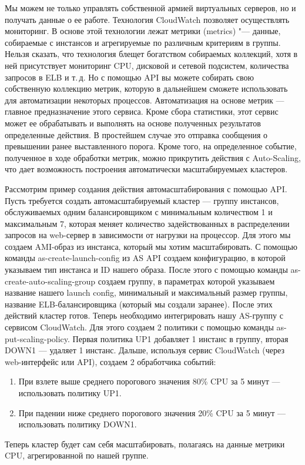 \documentclass[10pt, a5paper]{article}
\begin{document}
Мы можем не только управлять собственной армией виртуальных серверов, но и получать данные о ее работе. Технология \linebreak CloudWatch позволяет осуществлять мониторинг. В основе этой технологии лежат метрики (metrics) "--- данные, собираемые с инстансов и агрегируемые по различным критериям в группы. Нельзя сказать, что технология блещет богатством собираемых коллекций, хотя в ней присутствует мониторинг CPU, дисковой и сетевой подсистем, количества запросов в ELB и т.\,д. Но с помощью API вы можете собирать свою собственную коллекцию метрик, которую в дальнейшем сможете использовать для автоматизации некоторых процессов. Автоматизация на основе метрик --- главное предназначение этого сервиса. Кроме сбора статистики, этот сервис может ее обрабатывать и выполнять на основе полученных результатов определенные действия. В простейшем случае это отправка сообщения о превышении ранее выставленного порога. Кроме того, на определенное событие, полученное в ходе обработки метрик, можно прикрутить действия с Auto-Scaling, что дает возможность построения автоматически масштабируемыех кластеров. 

Рассмотрим пример создания действия автомасштабирования с помощью API. Пусть требуется создать автомасштабируемый кластер --- группу инстансов, обслуживаемых одним балансировщиком с минимальным количеством 1 и максимальным 7, которая меняет количество задействованных в распределении запросов на web-сервер в зависимости от нагрузки на процессор. Для этого мы создаем AMI-образ из инстанса, который мы хотим масштабировать. С помощью команды as-create-launch-config из AS API создаем конфигурацию, в которой указываем тип инстанса и ID нашего образа. После этого с помощью команды as-create-auto-scaling-group создаем группу, в параметрах которой указываем название нашего launch config, минимальный и максимальный размер группы, название ELB-балансировщика (который мы создали заранее). После этих действий кластер готов. Теперь необходимо интегрировать нашу AS-группу с сервисом CloudWatch. Для этого создаем 2 политики с помощью команды as-put-scaling-policy. Первая политика UP1 добавляет 1 инстанс в группу, вторая DOWN1 --- удаляет 1 инстанс. Дальше, используя сервис CloudWatch (через web-интерфейс или API), создаем 2 обработчика событий: 
\begin{enumerate}
	\item При взлете выше среднего порогового значения 80\% CPU за 5 минут --- использовать политику UP1. 
	\item При падении ниже среднего порогового значения 20\% CPU за 5 минут --- использовать политику DOWN1. 
\end{enumerate}
Теперь кластер будет сам себя масштабировать, полагаясь на данные метрики CPU, агрегированной по нашей группе. 
\end{document}
